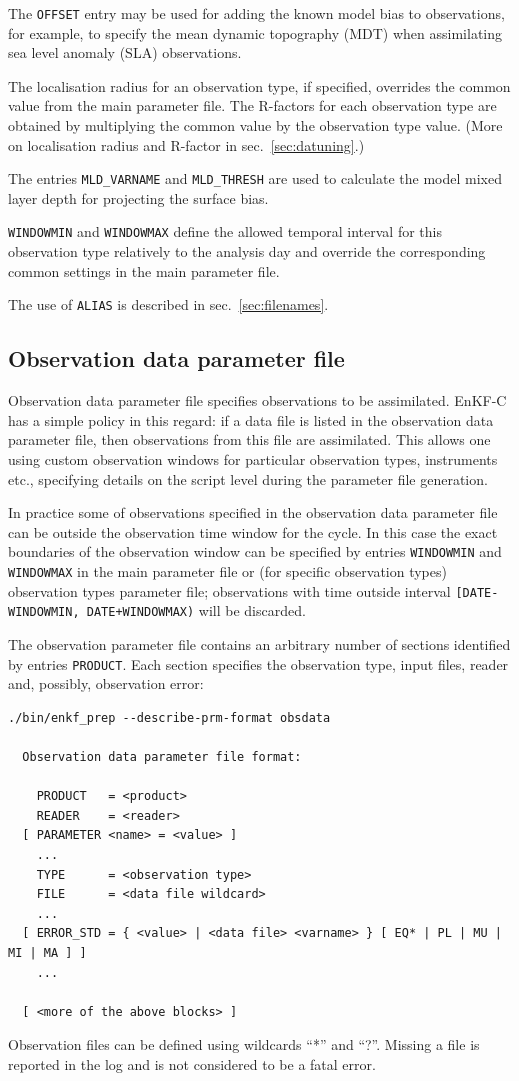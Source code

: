 \documentclass[11pt]{report}
\begin{document}
The \verb|OFFSET| entry may be used for adding the known model bias to observations, for example, to specify the mean dynamic topography (MDT) when assimilating sea level anomaly (SLA) observations.

The localisation radius for an observation type, if specified, overrides the
common value from the main parameter file.
The R-factors for each observation type are obtained by multiplying the common
value by the observation type value.
(More on localisation radius and R-factor in sec.~\ref{sec:datuning}.)

The entries \verb|MLD_VARNAME| and \verb|MLD_THRESH| are used to calculate the model mixed layer depth for projecting the surface bias.

\verb|WINDOWMIN| and \verb|WINDOWMAX| define the allowed temporal interval for this observation type relatively to the analysis day and override the corresponding common settings in the main parameter file.

The use of \verb|ALIAS| is described in sec.~\ref{sec:filenames}.

\subsection{Observation data parameter file}

Observation data parameter file specifies observations to be assimilated.
EnKF-C has a simple policy in this regard: if a data file is listed in the observation data parameter file, then observations from this file are assimilated.
This allows one using custom observation windows for particular observation types, instruments etc., specifying details on the script level during the parameter file generation.

In practice some of observations specified in the observation data parameter file can be outside the observation time window for the cycle.
In this case the exact boundaries of the observation window can be specified by entries \verb|WINDOWMIN| and \verb|WINDOWMAX| in the main parameter file or (for specific observation types) observation types parameter file;
observations with time outside interval \verb|[DATE-WINDOWMIN, DATE+WINDOWMAX)| will be discarded.

The observation parameter file contains an arbitrary number of sections identified by entries \verb|PRODUCT|.
Each section specifies the observation type, input files, reader and, possibly, observation error:
\begin{Verbatim}[frame=single,fontsize=\footnotesize]
./bin/enkf_prep --describe-prm-format obsdata

  Observation data parameter file format:

    PRODUCT   = <product>
    READER    = <reader>
  [ PARAMETER <name> = <value> ]
    ...
    TYPE      = <observation type>
    FILE      = <data file wildcard> 
    ...
  [ ERROR_STD = { <value> | <data file> <varname> } [ EQ* | PL | MU | MI | MA ] ]
    ...

  [ <more of the above blocks> ]
\end{Verbatim}
Observation files can be defined using wildcards ``*'' and ``?''.
Missing a file is reported in the log and is not considered to be a fatal error.
\end{document}
